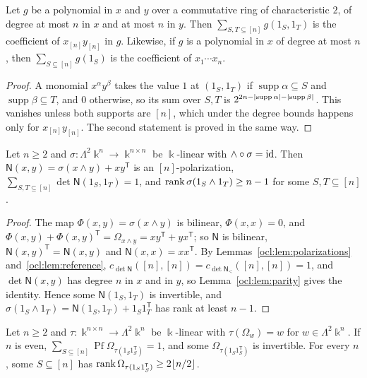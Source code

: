 \begin{lemma}\label{ocl:lem:parity}
Let $g$ be a polynomial in $x$ and $y$ over a commutative ring of characteristic $2$, of degree at most $n$ in $x$ and
at most $n$ in $y$. Then $\sum_{S,T\subseteq[n]}g(1_S,1_T)$ is the coefficient of $x_{[n]}y_{[n]}$ in $g$. Likewise, if
$g$ is a polynomial in $x$ of degree at most $n$, then $\sum_{S\subseteq[n]}g(1_S)$ is the coefficient of $x_1\cdots
x_n$.
\end{lemma}

\begin{proof}
A monomial $x^\alpha y^\beta$ takes the value $1$ at $(1_S,1_T)$ if $\operatorname{supp}\alpha\subseteq S$ and
$\operatorname{supp}\beta\subseteq T$, and $0$ otherwise, so its sum over $S,T$ is
$2^{2n-\lvert \operatorname{supp}\alpha\rvert-\lvert \operatorname{supp}\beta\rvert}$. This vanishes unless both supports are $[n]$,
which under the degree bounds happens only for $x_{[n]}y_{[n]}$. The second statement is proved in the same way.
\end{proof}

\begin{proposition}\label{ocl:prop:sections}
Let $n\ge2$ and $\sigma\colon\Lambda^2\Bbbk^n\to\Bbbk^{n\times n}$ be $\Bbbk$-linear with $\wedge\circ\sigma=\mathrm{id}$. Then
$\mathsf N(x,y)=\sigma(x\wedge y)+xy^{\mathsf T}$ is an $[n]$-polarization, $\sum_{S,T\subseteq[n]}\det\mathsf
N(1_S,1_T)=1$, and $\operatorname{rank}\sigma(1_S\wedge1_T)\ge n-1$ for some $S,T\subseteq[n]$.
\end{proposition}

\begin{proof}
The map $\Phi(x,y)=\sigma(x\wedge y)$ is bilinear, $\Phi(x,x)=0$, and $\Phi(x,y)+\Phi(x,y)^{\mathsf T}=\Omega_{x\wedge
y}=xy^{\mathsf T}+yx^{\mathsf T}$; so $\mathsf N$ is bilinear, $\mathsf N(x,y)^{\mathsf T}=\mathsf N(x,y)$ and
$\mathsf N(x,x)=xx^{\mathsf T}$. By Lemmas~\ref{ocl:lem:polarizations}
and~\ref{ocl:lem:reference}, $c_{\det\mathsf N}([n],[n])=c_{\det\mathsf N_<}([n],[n])=1$, and $\det\mathsf N(x,y)$ has
degree $n$ in $x$ and in $y$, so Lemma~\ref{ocl:lem:parity} gives the identity. Hence some $\mathsf N(1_S,1_T)$ is
invertible, and $\sigma(1_S\wedge1_T)=\mathsf N(1_S,1_T)+1_S1_T^{\mathsf T}$ has rank at least $n-1$.
\end{proof}

\begin{proposition}\label{ocl:prop:retractions}
Let $n\ge2$ and $\tau\colon\Bbbk^{n\times n}\to\Lambda^2\Bbbk^n$ be $\Bbbk$-linear with $\tau(\Omega_w)=w$ for
$w\in\Lambda^2\Bbbk^n$. If $n$ is even, $\sum_{S\subseteq[n]}\operatorname{Pf}\Omega_{\tau(1_S1_S^{\mathsf T})}=1$, and
some $\Omega_{\tau(1_S1_S^{\mathsf T})}$ is invertible. For every $n$, some $S\subseteq[n]$ has
$\operatorname{rank}\Omega_{\tau(1_S1_S^{\mathsf T})}\ge2\lfloor n/2\rfloor$.
\end{proposition}

